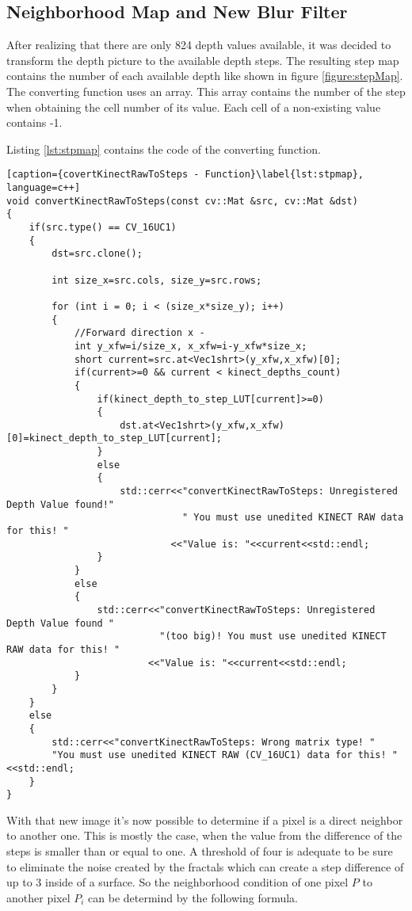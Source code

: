 \clearpage

\subsection{Neighborhood Map and New Blur Filter} \label{sect:blurFilter}
After realizing that there are only 824 depth values available, it was decided to transform the depth picture
to the available depth steps. The resulting step map contains the number of each available depth like 
shown in figure \vref{figure:stepMap}. The converting function uses an array. This array contains the number of the
step when obtaining the cell number of its value. Each cell of a non-existing value contains -1. 


Listing \vref{lst:stpmap} contains the code of the converting function.

\begin{lstlisting}[caption={covertKinectRawToSteps - Function}\label{lst:stpmap}, language=c++]
void convertKinectRawToSteps(const cv::Mat &src, cv::Mat &dst)
{
	if(src.type() == CV_16UC1)
	{
		dst=src.clone();

		int size_x=src.cols, size_y=src.rows;

		for (int i = 0; i < (size_x*size_y); i++)
		{
			//Forward direction x -
			int y_xfw=i/size_x, x_xfw=i-y_xfw*size_x;
			short current=src.at<Vec1shrt>(y_xfw,x_xfw)[0];
			if(current>=0 && current < kinect_depths_count)
			{
				if(kinect_depth_to_step_LUT[current]>=0)
				{
					dst.at<Vec1shrt>(y_xfw,x_xfw)[0]=kinect_depth_to_step_LUT[current];
				}
				else
				{
					std::cerr<<"convertKinectRawToSteps: Unregistered Depth Value found!" 
					           " You must use unedited KINECT RAW data for this! "
							 <<"Value is: "<<current<<std::endl;
				}
			}
			else
			{
				std::cerr<<"convertKinectRawToSteps: Unregistered Depth Value found " 
				           "(too big)! You must use unedited KINECT RAW data for this! "
						 <<"Value is: "<<current<<std::endl;
			}
		}
	}
	else
	{
		std::cerr<<"convertKinectRawToSteps: Wrong matrix type! "
		"You must use unedited KINECT RAW (CV_16UC1) data for this! "<<std::endl;
	}
}
\end{lstlisting}



With that new image it's now possible to determine if a pixel is a direct neighbor to another one. This is mostly the case,
when the value from the difference of the steps is smaller than or equal to one. A threshold of four is adequate to be sure 
to eliminate the noise created by the fractals which can create a step difference of up to 3 inside of a surface. 
So the neighborhood condition of one pixel $P$ to another pixel $P_i$ can be determind by the following formula.

